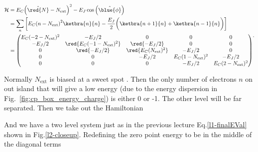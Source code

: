    \begin{equation}
	\begin{aligned}
	\mathcal{H} & = E_C{\left(\hat{\red{N}}-N_\text{ext}\right)^2}- E_J\cos\left(\hat{\blue{\phi}}\right)\\
	& = \sum_n\bigg[E_C{\left(n-N_\text{ext}\right)^2}\ketbra{n}{n}- \frac{E_J}{2}\bigg(\ketbra{n+1}{n}+\ketbra{n-1}{n}\bigg)\bigg]\\
	& = \begin{pmatrix}
		E_C(-2-N_\text{ext})^2 & -E_J/2 & 0 & 0 & 0\\
		-E_J/2 & \red{E_C(-1-N_\text{ext})^2} & \red{-E_J/2} & 0 & 0\\
		0 & \red{-E_J/2} & \red{E_C(N_\text{ext})^2} & -E_J/2 & 0\\
		0 & 0 & -E_J/2 & E_C(1-N_\text{ext})^2 & -E_J/2\\
		0 & 0& 0 & -E_J/2 & E_C(2-N_\text{ext})^2\\
	\end{pmatrix}
	\end{aligned}.
	\label{l2-subbed2}
   \end{equation}
   
    
   \noindent Normally $ N_\text{ext} $ is biased at a sweet spot . Then the only number of electrons $n$ on out island that will give a low energy (due to the energy dispersion in Fig.~\ref{fig:cp_box_energy_charge}) is either 0 or -1. The other level will be far separated. Then we take out the Hamiltonian
   

   \noindent And we have a two level system just as in the previous lecture Eq.\eqref{l1-finalEVal} shown in Fig.\ref{l2-closeup}. Redefining the zero point energy to be in the middle of the diagonal terms
   
